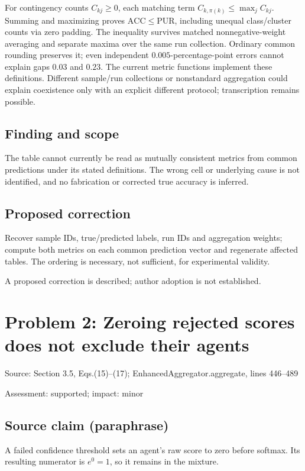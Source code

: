 \documentclass[11pt]{article}
\begin{document}
For contingency counts \(C_{kj}\ge0\), each matching term \(C_{k,\pi(k)}\le\max_jC_{kj}\). Summing and maximizing proves \(\mathrm{ACC}\le\mathrm{PUR}\), including unequal class/cluster counts via zero padding. The inequality survives matched nonnegative-weight averaging and separate maxima over the same run collection. Ordinary common rounding preserves it; even independent \(0.005\)-percentage-point errors cannot explain gaps \(0.03\) and \(0.23\). The current metric functions implement these definitions. Different sample/run collections or nonstandard aggregation could explain coexistence only with an explicit different protocol; transcription remains possible.

\subsection*{Finding and scope}

The table cannot currently be read as mutually consistent metrics from common predictions under its stated definitions. The wrong cell or underlying cause is not identified, and no fabrication or corrected true accuracy is inferred.

\subsection*{Proposed correction}

Recover sample IDs, true/predicted labels, run IDs and aggregation weights; compute both metrics on each common prediction vector and regenerate affected tables. The ordering is necessary, not sufficient, for experimental validity.

A proposed correction is described; author adoption is not established.

\section*{Problem 2: Zeroing rejected scores does not exclude their agents}

Source: Section 3.5, Eqs.(15)–(17); EnhancedAggregator.aggregate, lines 446–489

Assessment: supported; impact: minor

\subsection*{Source claim (paraphrase)}

A failed confidence threshold sets an agent’s raw score to zero before softmax. Its resulting numerator is \(e^0=1\), so it remains in the mixture.
\end{document}
